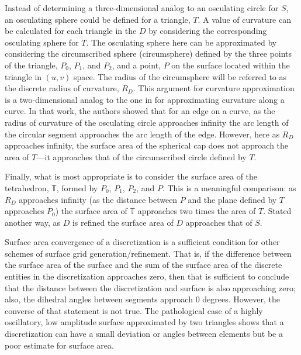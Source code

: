 Instead of determining a three-dimensional analog to an osculating
circle for $S$, an osculating sphere could be defined for a triangle,
$T$. A value of curvature can be calculated for each triangle in the $D$
by considering the corresponding osculating sphere for $T$. The
osculating sphere here can be approximated by considering the
circumscribed sphere (circumsphere) \cite{casey1888} defined by the
three points of the triangle, $P_0$, $P_1$, and $P_2$, and a point, $P$
on the surface located within the triangle in $(u,v)$ space. The radius
of the circumsphere will be referred to as the discrete radius of
curvature, $R_D$. This argument for curvature approximation is a
two-dimensional analog to the one in \cite{mclaurin12} for approximating
curvature along a curve. In that work, the authors showed that for an
edge on a curve, as the radius of curvature of the osculating circle
approaches infinity the arc length of the circular segment approaches
the arc length of the edge.  However, here as $R_D$ approaches infinity,
the surface area of the spherical cap does not approach the area of
$T$---it approaches that of the circumscribed circle defined by $T$.

Finally, what is most appropriate is to consider the surface area of the
tetrahedron, ${\mathbb T}$, formed by $P_0$, $P_1$, $P_2$, and $P$. This
is a meaningful comparison: as $R_D$ approaches infinity (as the
distance between $P$ and the plane defined by $T$ approaches $P_0$) the
surface area of ${\mathbb T}$ approaches two times the area of $T$.
Stated another way, as $D$ is refined the surface area of $D$ approaches
that of $S$.

Surface area convergence of a discretization is a sufficient condition
for other schemes of surface grid generation/refinement. That is, if the
difference between the surface area of the surface and the sum of the
surface area of the discrete entities in the discretization approaches
zero, then that is sufficient to conclude that the distance between the
discretization and surface is also approaching zero; also, the dihedral
angles between segments approach $0$ degrees. However, the converse of
that statement is not true. The pathological case of a highly
oscillatory, low amplitude surface approximated by two triangles shows
that a discretization can have a small deviation or angles between
elements but be a poor estimate for surface area.
